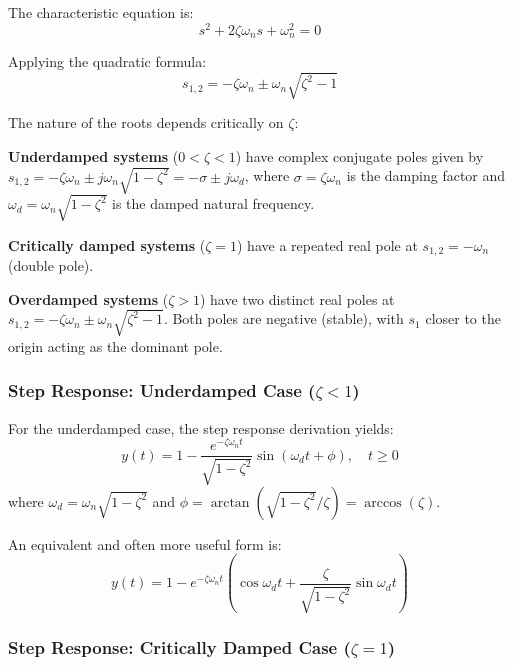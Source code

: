 The characteristic equation is:
\begin{equation}
s^2 + 2\zeta\omega_n s + \omega_n^2 = 0
\end{equation}

Applying the quadratic formula:
\begin{equation}
\boxed{s_{1,2} = -\zeta\omega_n \pm \omega_n\sqrt{\zeta^2 - 1}}
\label{eq:poles}
\end{equation}

The nature of the roots depends critically on $\zeta$:

\begin{keyconceptbox}
\textbf{Underdamped systems} ($0 < \zeta < 1$) have complex conjugate poles given by $s_{1,2} = -\zeta\omega_n \pm j\omega_n\sqrt{1-\zeta^2} = -\sigma \pm j\omega_d$, where $\sigma = \zeta\omega_n$ is the damping factor and $\omega_d = \omega_n\sqrt{1-\zeta^2}$ is the damped natural frequency.

\textbf{Critically damped systems} ($\zeta = 1$) have a repeated real pole at $s_{1,2} = -\omega_n$ (double pole).

\textbf{Overdamped systems} ($\zeta > 1$) have two distinct real poles at $s_{1,2} = -\zeta\omega_n \pm \omega_n\sqrt{\zeta^2 - 1}$. Both poles are negative (stable), with $s_1$ closer to the origin acting as the dominant pole.
\end{keyconceptbox}

\subsubsection{Step Response: Underdamped Case ($\zeta < 1$)}

For the underdamped case, the step response derivation yields:
\begin{equation}
\boxed{y(t) = 1 - \frac{e^{-\zeta\omega_n t}}{\sqrt{1-\zeta^2}}\sin\left(\omega_d t + \phi\right), \quad t \geq 0}
\label{eq:underdamped_step}
\end{equation}
where $\omega_d = \omega_n\sqrt{1-\zeta^2}$ and $\phi = \arctan\left(\sqrt{1-\zeta^2}/\zeta\right) = \arccos(\zeta)$.

An equivalent and often more useful form is:
\begin{equation}
y(t) = 1 - e^{-\zeta\omega_n t}\left(\cos\omega_d t + \frac{\zeta}{\sqrt{1-\zeta^2}}\sin\omega_d t\right)
\end{equation}

\subsubsection{Step Response: Critically Damped Case ($\zeta = 1$)}

